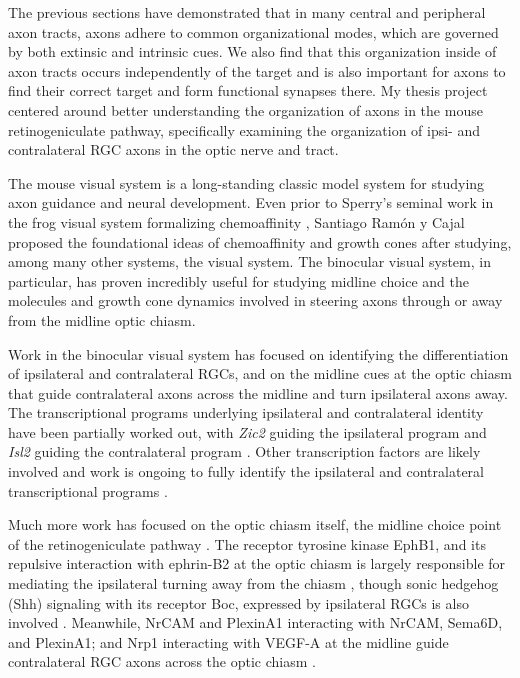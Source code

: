 The previous sections have demonstrated that in many central and peripheral axon tracts, axons adhere to common organizational modes, which are governed by both extinsic and intrinsic cues.
We also find that this organization inside of axon tracts occurs independently of the target and is also important for axons to find their correct target and form functional synapses there.
My thesis project centered around better understanding the organization of axons in the mouse retinogeniculate pathway, specifically examining the organization of ipsi- and contralateral RGC axons in the optic nerve and tract.

The mouse visual system is a long-standing classic model system for studying axon guidance and neural development.
Even prior to Sperry's seminal work in the frog visual system formalizing chemoaffinity \cite{sperry1963chemoaffinity}, Santiago Ram\'on y Cajal proposed the foundational ideas of chemoaffinity and growth cones after studying, among many other systems, the visual system.
The binocular visual system, in particular, has proven incredibly useful for studying midline choice and the molecules and growth cone dynamics involved in steering axons through or away from the midline optic chiasm.

Work in the binocular visual system has focused on identifying the differentiation of ipsilateral and contralateral RGCs, and on the midline cues at the optic chiasm that guide contralateral axons across the midline and turn ipsilateral axons away.
The transcriptional programs underlying ipsilateral and contralateral identity have been partially worked out, with \emph{Zic2} guiding the ipsilateral program and \emph{Isl2} guiding the contralateral program \cite{herrera2003zic2,garcia2008zic2,pak2004magnitude}.
Other transcription factors are likely involved and work is ongoing to fully identify the ipsilateral and contralateral transcriptional programs \cite[reviewed in part by][]{erskine2014connecting}.

Much more work has focused on the optic chiasm itself, the midline choice point of the retinogeniculate pathway \cite[reviewed in][]{erskine2014connecting,petros2008retinal}.
The receptor tyrosine kinase EphB1, and its repulsive interaction with ephrin-B2 at the optic chiasm is largely responsible for mediating the ipsilateral turning away from the chiasm \cite{nakagawa2000ephrin,williams2003ephrin,petros2009specificity}, though sonic hedgehog (Shh) signaling with its receptor Boc, expressed by ipsilateral RGCs is also involved \cite{fabre2010segregation}.
Meanwhile, NrCAM and PlexinA1 interacting with NrCAM, Sema6D, and PlexinA1; and Nrp1 interacting with VEGF-A at the midline guide contralateral RGC axons across the optic chiasm \cite{williams2006role,kuwajima2012optic,erskine2011vegf}.

